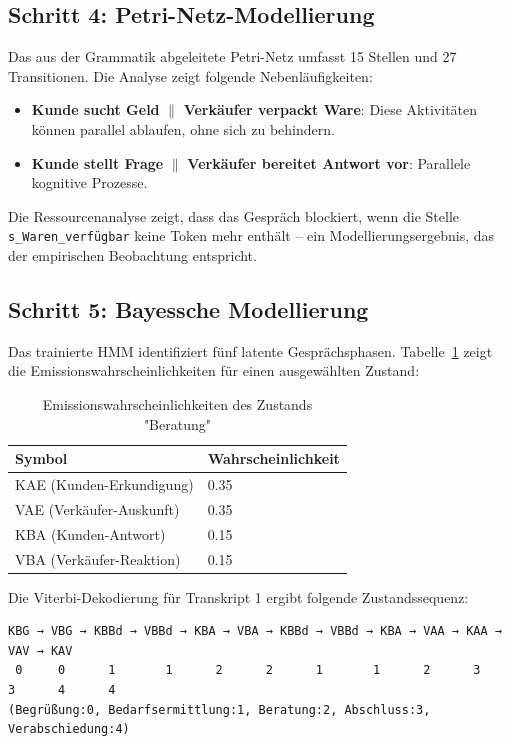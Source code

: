 \documentclass[12pt,a4paper]{article}
\begin{document}
\subsection{Schritt 4: Petri-Netz-Modellierung}

Das aus der Grammatik abgeleitete Petri-Netz umfasst 15 Stellen und 27 Transitionen. 
Die Analyse zeigt folgende Nebenläufigkeiten:

\begin{itemize}
    \item \textbf{Kunde sucht Geld} $\parallel$ \textbf{Verkäufer verpackt Ware}: 
    Diese Aktivitäten können parallel ablaufen, ohne sich zu behindern.
    \item \textbf{Kunde stellt Frage} $\parallel$ \textbf{Verkäufer bereitet Antwort vor}: 
    Parallele kognitive Prozesse.
\end{itemize}

Die Ressourcenanalyse zeigt, dass das Gespräch blockiert, wenn die Stelle 
\texttt{s\_Waren\_verfügbar} keine Token mehr enthält – ein Modellierungsergebnis, 
das der empirischen Beobachtung entspricht.

\subsection{Schritt 5: Bayessche Modellierung}

Das trainierte HMM identifiziert fünf latente Gesprächsphasen. Tabelle~\ref{tab:hmm} 
zeigt die Emissionswahrscheinlichkeiten für einen ausgewählten Zustand:

\begin{table}[H]
\centering
\caption{Emissionswahrscheinlichkeiten des Zustands "Beratung"}
\label{tab:hmm}
\begin{tabular}{@{} l l @{}}
\toprule
\textbf{Symbol} & \textbf{Wahrscheinlichkeit} \\
\midrule
KAE (Kunden-Erkundigung) & 0.35 \\
VAE (Verkäufer-Auskunft) & 0.35 \\
KBA (Kunden-Antwort) & 0.15 \\
VBA (Verkäufer-Reaktion) & 0.15 \\
\bottomrule
\end{tabular}
\end{table}

Die Viterbi-Dekodierung für Transkript 1 ergibt folgende Zustandssequenz:

\begin{verbatim}
KBG → VBG → KBBd → VBBd → KBA → VBA → KBBd → VBBd → KBA → VAA → KAA → VAV → KAV
 0     0      1       1      2      2      1       1      2      3      3      4      4
(Begrüßung:0, Bedarfsermittlung:1, Beratung:2, Abschluss:3, Verabschiedung:4)
\end{verbatim}
\end{document}
